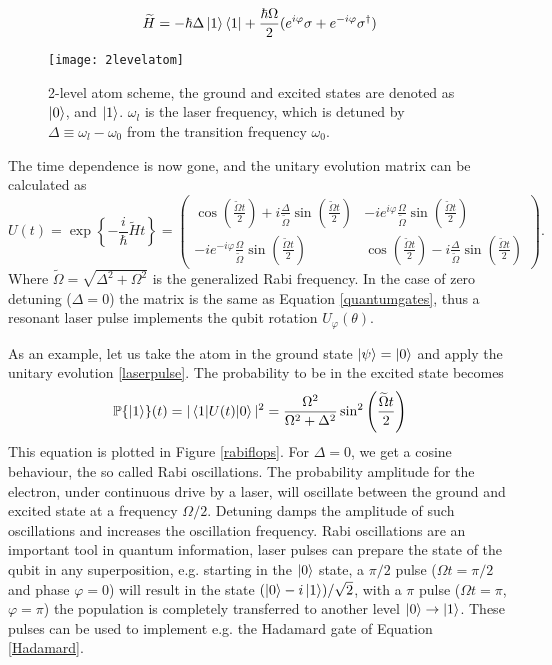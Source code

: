 \begin{equation}
\label{Hamiltonianrotatingframe}
\widetilde{H} = -\hbar \Delta \ket{1}\bra{1} + \frac{\hbar \Omega}{2}(e^{i\varphi}\sigma + e^{-i\varphi}\sigma^\dagger)
\end{equation}
\begin{figure}
\centering
\texttt{[image: 2levelatom]}
\caption{2-level atom scheme, the ground and excited states are denoted as $\ket{0}$, and $\ket{1}$. $\omega_l$ is the laser frequency, which is detuned by $\Delta \equiv \omega_l - \omega_0$ from the transition frequency $\omega_0$.}
\label{2levelatom}
\end{figure}
The time dependence is now gone, and the unitary evolution matrix can be calculated as
\begin{equation}
\label{laserpulse}
U(t) = \exp\left\{-\frac{i}{\hbar} \widetilde{H} t \right\} =
 \begin{pmatrix}
  \cos\left(\frac{\widetilde{\Omega} t}{2}\right) + i \frac{\Delta}{\widetilde{\Omega}} \sin\left(\frac{\widetilde{\Omega} t}{2}\right) & -ie^{i\varphi}\frac{\Omega}{\widetilde{\Omega}}  \sin\left(\frac{\widetilde{\Omega} t}{2}\right) \\
  -ie^{-i\varphi}\frac{\Omega}{\widetilde{\Omega}}  \sin\left(\frac{\widetilde{\Omega} t}{2}\right)  & \cos\left(\frac{\widetilde{\Omega} t}{2}\right) - i \frac{\Delta}{\widetilde{\Omega}} \sin\left(\frac{\widetilde{\Omega} t}{2}\right)
\end{pmatrix}.
\end{equation}
Where $\widetilde{\Omega} = \sqrt{\Delta^2 + \Omega^2}$ is the generalized Rabi frequency. In the case of zero detuning ($\Delta = 0$) the matrix is the same as Equation \eqref{quantumgates}, thus a resonant laser pulse implements the qubit rotation $U_{\varphi}(\theta)$.\par
As an example, let us take the atom in the ground state $\ket{\psi} = \ket{0}$ and apply the unitary evolution \eqref{laserpulse}. The probability to be in the excited state becomes
\begin{equation}
\label{eq:rabifrequency}
\mathbb{P}\{\ket{1}\}(t) = |\braket{1|U(t)|0}|^2 = \frac{\Omega^2}{\Omega^2+\Delta^2} \sin^2\left(\frac{\widetilde{\Omega}t}{2} \right)
\end{equation}
This equation is plotted in Figure \ref{rabiflops}. For $\Delta = 0$, we get a cosine behaviour, the so called Rabi oscillations. The probability amplitude for the electron, under continuous drive by a laser, will oscillate between the ground and excited state at a frequency $\Omega/2$. Detuning damps the amplitude of such oscillations and increases the oscillation frequency. Rabi oscillations are an important tool in quantum information, laser pulses can prepare the state of the qubit in any superposition, e.g. starting in the $\ket{0}$ state, a $\pi/2$ pulse ($\Omega t = \pi/2$ and phase $\varphi=0$) will result in the state $(\ket{0} - i\ket{1})/\sqrt{2}$, with a $\pi$ pulse ($\Omega t = \pi$, $\varphi=\pi$) the population is completely transferred to another level $\ket{0}\to \ket{1}$. These pulses can be used to implement e.g. the Hadamard gate of Equation \eqref{Hadamard}.
